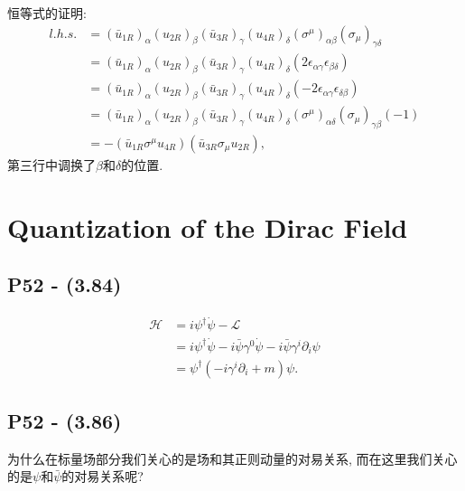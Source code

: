 恒等式的证明:
\begin{equation}
  \begin{aligned}
    l.h.s. & = (\bar{u}_{1R})_\alpha (u_{2R})_\beta (\bar{u}_{3R})_\gamma (u_{4R})_\delta (\sigma^{\mu})_{\alpha\beta} (\sigma_{\mu})_{\gamma\delta}      \\
           & = (\bar{u}_{1R})_\alpha (u_{2R})_\beta (\bar{u}_{3R})_\gamma (u_{4R})_\delta (2\epsilon_{\alpha\gamma} \epsilon_{\beta\delta})               \\
           & = (\bar{u}_{1R})_\alpha (u_{2R})_\beta (\bar{u}_{3R})_\gamma (u_{4R})_\delta (-2\epsilon_{\alpha\gamma} \epsilon_{\delta\beta})              \\
           & = (\bar{u}_{1R})_\alpha (u_{2R})_\beta (\bar{u}_{3R})_\gamma (u_{4R})_\delta (\sigma^{\mu})_{\alpha\delta} (\sigma_{\mu})_{\gamma\beta} (-1) \\
           & = -(\bar{u}_{1R} \sigma^{\mu} u_{4R})(\bar{u}_{3R} \sigma_{\mu} u_{2R}),
  \end{aligned}
\end{equation}
第三行中调换了$\beta$和$\delta$的位置.

\section{Quantization of the Dirac Field}

\subsection{{P52} - (3.84)}
\begin{equation}
  \begin{aligned}
    \mathcal{H} & = i {\psi}^\dagger \dot{\psi} - \mathcal{L}                                                              \\
                & = i {\psi}^\dagger \dot{\psi} - i \bar{\psi} \gamma^0 \dot{\psi} - i \bar{\psi} \gamma^i \partial_i \psi \\
                & = {\psi}^\dagger (-i \gamma^i \partial_i + m) \psi.
  \end{aligned}
\end{equation}


\subsection{P52 - (3.86)}
为什么在标量场部分我们关心的是场和其正则动量的对易关系, 而在这里我们关心的是$\psi$和$\bar{\psi}$的对易关系呢?

